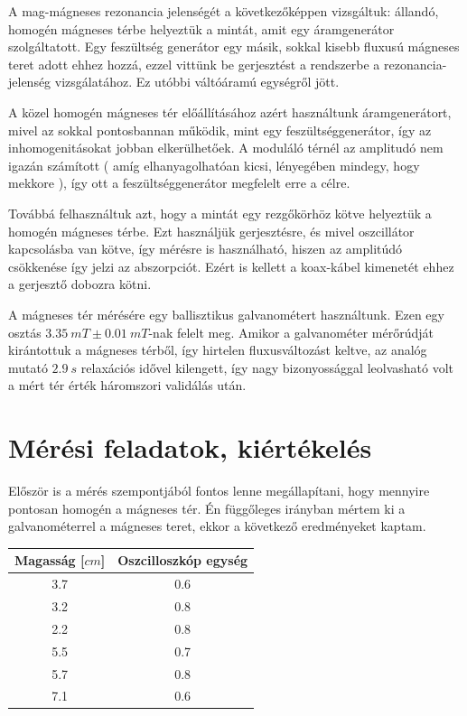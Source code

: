 \documentclass[a4paper,12pt]{article}
\begin{document}
\par A mag-mágneses rezonancia jelenségét a következőképpen vizsgáltuk: állandó, homogén mágneses térbe helyeztük a mintát, amit egy áramgenerátor szolgáltatott. Egy feszültség generátor egy másik, sokkal kisebb fluxusú mágneses teret adott ehhez hozzá, ezzel vittünk be gerjesztést a rendszerbe a rezonancia-jelenség vizsgálatához. Ez utóbbi váltóáramú egységről jött.

\par A közel homogén mágneses tér előállításához azért használtunk áramgenerátort, mivel az sokkal pontosbannan működik, mint egy feszültséggenerátor, így az inhomogenitásokat jobban elkerülhetőek. A moduláló térnél az amplitudó nem igazán számított ( amíg elhanyagolhatóan kicsi, lényegében mindegy, hogy mekkore ), így ott a feszültséggenerátor megfelelt erre a célre.

\par Továbbá felhasználtuk azt, hogy a mintát egy rezgőkörhöz kötve helyeztük a homogén mágneses térbe. Ezt használjük gerjesztésre, és mivel oszcillátor kapcsolásba van kötve, így mérésre is használható, hiszen az amplitúdó csökkenése így jelzi az abszorpciót. Ezért is kellett a koax-kábel kimenetét ehhez a gerjesztő dobozra kötni.

\par A mágneses tér mérésére egy ballisztikus galvanométert használtunk. Ezen egy osztás $3.35 ~mT \pm 0.01 ~mT$-nak felelt meg. Amikor a galvanométer mérőrúdját kirántottuk a mágneses térből, így hirtelen fluxusváltozást keltve, az analóg mutató $2.9 ~s$ relaxációs idővel kilengett, így nagy bizonyossággal leolvasható volt a mért tér érték háromszori validálás után.

\section{Mérési feladatok, kiértékelés}

\par Először is a mérés szempontjából fontos lenne megállapítani, hogy mennyire pontosan homogén a mágneses tér. Én függőleges irányban mértem ki a galvanométerrel a mágneses teret, ekkor a következő eredményeket kaptam.

\begin{center}
\begin{tabular}{|c|c|}
\hline
Magasság [$cm$] & Oszcilloszkóp egység \\
\hline
3.7 & 0.6 \\
\hline
3.2 & 0.8 \\
\hline
2.2 & 0.8 \\
\hline
5.5 & 0.7 \\
\hline
5.7 & 0.8 \\
\hline
7.1 & 0.6 \\
\hline
\end{tabular}
\end{center}
\end{document}
